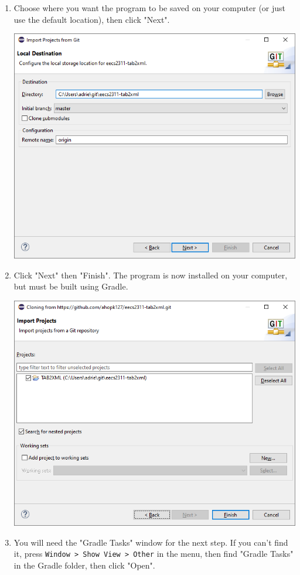 \documentclass[11pt]{article}
\begin{document}
\begin{enumerate}
\begin{center}
\end{center}
\item Choose where you want the program to be saved on your computer (or just use the default location), then click "Next".
\begin{center}
\includegraphics[width=.9\linewidth]{../Screenshots/eclipse-install-5.png}
\end{center}
\item Click "Next" then "Finish".  The program is now installed on your computer, but must be built using Gradle.
\begin{center}
\includegraphics[width=.9\linewidth]{../Screenshots/eclipse-install-7.png}
\end{center}
\item You will need the "Gradle Tasks" window for the next step.  If you can't find it, press \texttt{Window > Show View > Other} in the menu, then find "Gradle Tasks" in the Gradle folder, then click "Open".

\end{enumerate}
\end{document}
